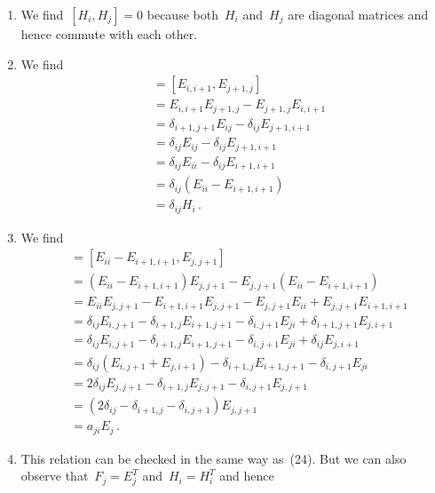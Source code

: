 \begin{enumerate}[label=(\arabic*),start=22]
  \item
    We find~$[H_i, H_j] = 0$ because both~$H_i$ and~$H_j$ are diagonal matrices and hence commute with each other.
  \item
    We find
    \begin{align*}
      [E_i, F_j]
      &=
      [E_{i,i+1}, E_{j+1,j}]
      \\
      &=
      E_{i,i+1} E_{j+1,j} - E_{j+1,j} E_{i,i+1}
      \\
      &=
      \delta_{i+1,j+1} E_{ij} - \delta_{ij} E_{j+1,i+1}
      \\
      &=
      \delta_{ij} E_{ij} - \delta_{ij} E_{j+1,i+1}
      \\
      &=
      \delta_{ij} E_{ii} - \delta_{ij} E_{i+1,i+1}
      \\
      &=
      \delta_{ij} (E_{ii} - E_{i+1,i+1})
      \\
      &=
      \delta_{ij} H_i \,.
    \end{align*}
  \item
    \label{H and E}
    We find
    \begin{align*}
      [H_i, E_j]
      &=
      [E_{ii} - E_{i+1,i+1}, E_{j,j+1}]
      \\
      &=
      (E_{ii} - E_{i+1,i+1}) E_{j,j+1} - E_{j,j+1} (E_{ii} - E_{i+1,i+1})
      \\
      &=
      E_{ii} E_{j,j+1} - E_{i+1,i+1} E_{j,j+1} - E_{j,j+1} E_{ii} + E_{j,j+1} E_{i+1, i+1}
      \\
      &=
      \delta_{ij} E_{i,j+1} - \delta_{i+1,j} E_{i+1,j+1} - \delta_{i,j+1} E_{ji} + \delta_{i+1,j+1} E_{j,i+1}
      \\
      &=
      \delta_{ij} E_{i,j+1} - \delta_{i+1,j} E_{i+1,j+1} - \delta_{i,j+1} E_{ji} + \delta_{ij} E_{j,i+1}
      \\
      &=
      \delta_{ij} (E_{i,j+1} + E_{j,i+1}) - \delta_{i+1,j} E_{i+1,j+1} - \delta_{i,j+1} E_{ji}
      \\
      &=
      2 \delta_{ij} E_{j,j+1} - \delta_{i+1,j} E_{j,j+1} - \delta_{i,j+1} E_{j,j+1}
      \\
      &=
      (2 \delta_{ij} - \delta_{i+1,j} - \delta_{i,j+1}) E_{j,j+1}
      \\
      &=
      a_{ji} E_j  \,.
    \end{align*}
  \item
    \label{H and F}
    This relation can be checked in the same way as~(24).
    But we can also observe that~$F_j = E_j^T$ and~$H_i = H_i^T$ and hence

\end{enumerate}
